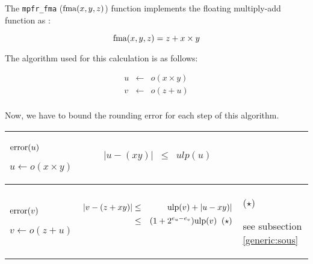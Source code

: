 \documentclass[12pt]{amsart}
\def\n{\textnormal}
\def\ulp{{\rm ulp}}
\begin{document}
The {\tt mpfr\_fma} ($\n{fma}(x,y,z)$) function implements the floating multiply-add function  as :

\[
\textnormal{fma} (x,y,z) = z + x \times y
\]

The algorithm used for this calculation is as follows:

\begin{eqnarray}\nonumber
u&\leftarrow&o(x \times y)\\\nonumber
v&\leftarrow&o(z + u)\\\nonumber
\end{eqnarray}

Now, we have to bound the rounding error for each step of this
algorithm.  



\begin{center}
\begin{tabular}{l|l |l}

\begin{minipage}{2.5cm}


${\textnormal{error}}(u)$


$u \leftarrow o(x \times y)$

\end{minipage} &
\begin{minipage}{7.5cm}

\begin{eqnarray}\nonumber
  |u-(xy)| &\leq& ulp(u)\\\nonumber
\end{eqnarray}

\end{minipage} &
\begin{minipage}{6cm}
{\hspace{7cm}}
\end{minipage}\\\hline
\begin{minipage}{2.5cm}
${\textnormal{error}}(v)$


$v \leftarrow o(z+u) $

\end{minipage} &
\begin{minipage}{7.5cm}

\begin{eqnarray}\nonumber
  |v-(z+xy)| &\leq& \ulp(v) + |u - xy)|\\\nonumber
&\leq& (1+2^{e_u-e_v})\ulp(v)\;\;(\star)\\\nonumber
\end{eqnarray}


\end{minipage} &
\begin{minipage}{6cm}
($\star$)

see subsection \ref{generic:sous}


\end{minipage}
\end{tabular}
\end{center}
\end{document}
